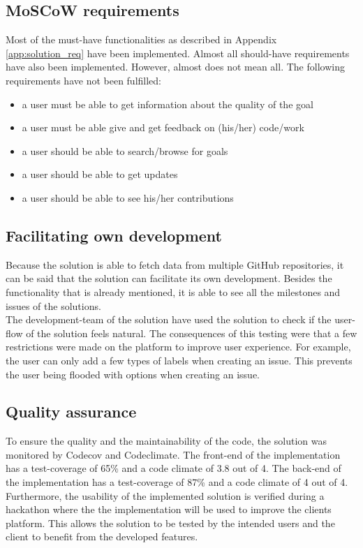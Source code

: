 \subsection{MoSCoW requirements}

Most of the must-have functionalities as described in Appendix \ref{app:solution_req} have been implemented. Almost all should-have requirements have also been implemented. However, almost does not mean all. The following requirements have not been fulfilled:
\begin{itemize}
    \item a user must be able to get information about the quality of the goal
    \item a user must be able give and get feedback on (his/her) code/work
    \item a user should be able to search/browse for goals
    \item a user should be able to get updates
    \item a user should be able to see his/her contributions
\end{itemize}


\subsection{Facilitating own development}
Because the solution is able to fetch data from multiple GitHub repositories, it can be said that the solution can facilitate its own development. Besides the functionality that is already mentioned, it is able to see all the milestones and issues of the solutions.\\
The development-team of the solution have used the solution to check if the user-flow of the solution feels natural. The consequences of this testing were that a few restrictions were made on the platform to improve user experience. For example, the user can only add a few types of labels when creating an issue. This prevents the user being flooded with options when creating an issue.

\subsection{Quality assurance}
To ensure the quality and the maintainability of the code, the solution was monitored by Codecov and Codeclimate. The front-end of the implementation has a test-coverage of 65\% and a code climate of 3.8 out of 4. The back-end of the implementation has a test-coverage of 87\% and a code climate of 4 out of 4. Furthermore, the usability of the implemented solution is verified during a hackathon where the the implementation will be used to improve the clients platform. This allows the solution to be tested by the intended users and the client to benefit from the developed features.

